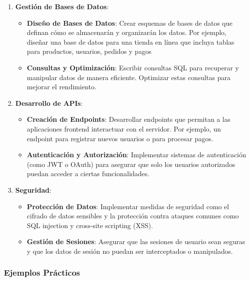 \documentclass[
  letterpaper,
  DIV=11,
  numbers=noendperiod]{scrreprt}
\begin{document}
\begin{enumerate}
\def\labelenumi{\arabic{enumi}.}
\item
  \textbf{Gestión de Bases de Datos}:

  \begin{itemize}
  \item
    \textbf{Diseño de Bases de Datos}: Crear esquemas de bases de datos
    que definan cómo se almacenarán y organizarán los datos. Por
    ejemplo, diseñar una base de datos para una tienda en línea que
    incluya tablas para productos, usuarios, pedidos y pagos
  \item
    \textbf{Consultas y Optimización}: Escribir consultas SQL para
    recuperar y manipular datos de manera eficiente. Optimizar estas
    consultas para mejorar el rendimiento.
  \end{itemize}
\item
  \textbf{Desarrollo de APIs}:

  \begin{itemize}
  \item
    \textbf{Creación de Endpoints}: Desarrollar endpoints que permitan a
    las aplicaciones frontend interactuar con el servidor. Por ejemplo,
    un endpoint para registrar nuevos usuarios o para procesar pagos.
  \item
    \textbf{Autenticación y Autorización}: Implementar sistemas de
    autenticación (como JWT o OAuth) para asegurar que solo los usuarios
    autorizados puedan acceder a ciertas funcionalidades.
  \end{itemize}
\item
  \textbf{Seguridad}:

  \begin{itemize}
  \item
    \textbf{Protección de Datos}: Implementar medidas de seguridad como
    el cifrado de datos sensibles y la protección contra ataques comunes
    como SQL injection y cross-site scripting (XSS).
  \item
    \textbf{Gestión de Sesiones}: Asegurar que las sesiones de usuario
    sean seguras y que los datos de sesión no puedan ser interceptados o
    manipulados.
  \end{itemize}
\end{enumerate}

\subsubsection{\texorpdfstring{\textbf{Ejemplos
Prácticos}}{Ejemplos Prácticos}}\label{ejemplos-pruxe1cticos}
\end{document}

